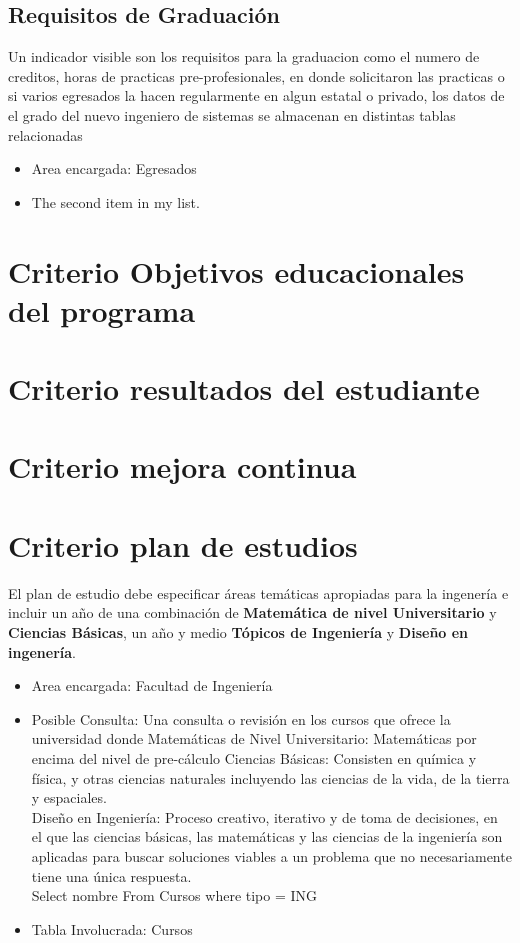 \documentclass[12pt,a4paper]{report}
\begin{document}
\subsection{Requisitos de Graduación}
Un indicador visible son los requisitos para la graduacion como el numero de creditos, horas de practicas pre-profesionales, en donde solicitaron las practicas o si varios egresados la hacen regularmente en algun estatal o privado, los datos de el grado del nuevo ingeniero de sistemas se almacenan en distintas tablas relacionadas
\begin{itemize}
\item Area encargada: Egresados
\item The second item in my list.
\end{itemize}

\section{ Criterio Objetivos educacionales del programa}

\section{ Criterio resultados del estudiante}

\section{ Criterio mejora continua}

\section{ Criterio plan de estudios}
El plan de estudio debe especificar áreas temáticas apropiadas para la ingenería e incluir un año de una combinación de \textbf{Matemática de nivel Universitario} y \textbf{Ciencias Básicas}, un año y medio \textbf{Tópicos de Ingeniería} y \textbf{Diseño en ingenería}.

\begin{itemize}
\item Area encargada: Facultad de Ingeniería

\item Posible Consulta: Una consulta o revisión en los cursos que ofrece la universidad donde Matemáticas de Nivel Universitario: Matemáticas por encima del nivel de pre-cálculo
Ciencias Básicas: Consisten en química y física, y otras ciencias naturales incluyendo las ciencias de la vida, de la tierra y espaciales.\\
Diseño en Ingeniería: Proceso creativo, iterativo y de toma de decisiones, en el que las ciencias básicas, las matemáticas y las ciencias de la ingeniería son aplicadas para buscar soluciones viables a un problema que no necesariamente tiene una única respuesta.\\
Select nombre From Cursos where tipo = ING

\item Tabla Involucrada: Cursos
\end{itemize}
\end{document}
